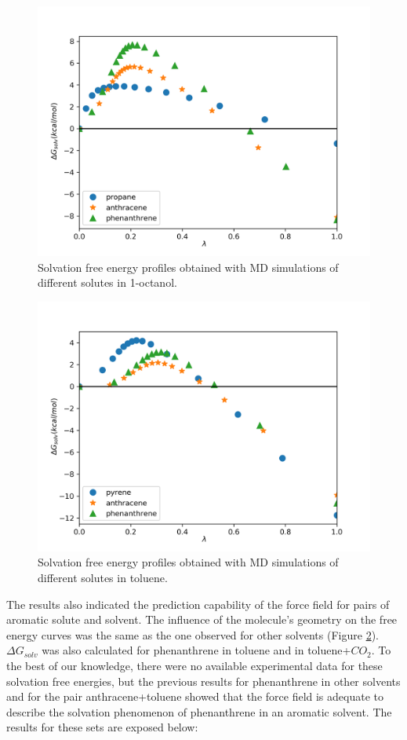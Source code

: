 \begin{figure}[H]
    \centering
    \includegraphics[width=0.8\linewidth]{Figures/oct}
    \caption{Solvation free energy profiles obtained with MD simulations of different solutes in 1-octanol.}
    \label{fig:oct}
\end{figure}

\begin{figure}[H]
    \centering
    \includegraphics[width=0.8\linewidth]{Figures/tol}
    \caption{Solvation free energy profiles obtained with MD simulations of different solutes in toluene. }
    \label{fig:tol}
\end{figure}

 The results also indicated the prediction capability of the force field for pairs of aromatic solute and solvent. The influence of the molecule's geometry on the free energy curves was the same as the one observed for other solvents (Figure \ref{fig:tol}). $\Delta G_{solv}$ was also calculated for phenanthrene in toluene and in toluene+$CO_{2}$. To the best of our knowledge, there were no available experimental data for these solvation free energies, but the previous results for phenanthrene in other solvents and for the pair anthracene+toluene showed that the force field is adequate to describe the solvation phenomenon of phenanthrene in an aromatic solvent. The results for these sets are exposed below: 
 
